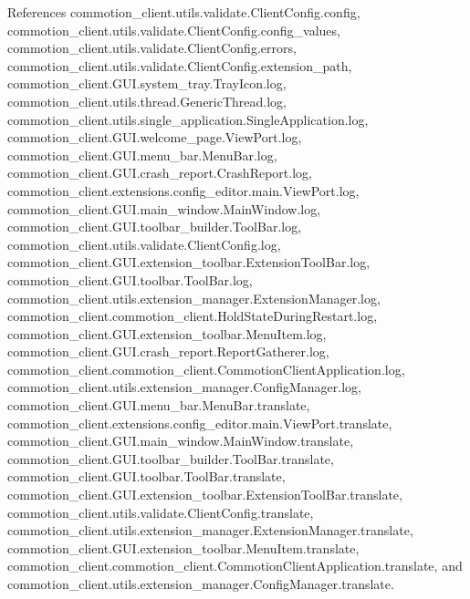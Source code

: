 References commotion\+\_\+client.\+utils.\+validate.\+Client\+Config.\+config, commotion\+\_\+client.\+utils.\+validate.\+Client\+Config.\+config\+\_\+values, commotion\+\_\+client.\+utils.\+validate.\+Client\+Config.\+errors, commotion\+\_\+client.\+utils.\+validate.\+Client\+Config.\+extension\+\_\+path, commotion\+\_\+client.\+G\+U\+I.\+system\+\_\+tray.\+Tray\+Icon.\+log, commotion\+\_\+client.\+utils.\+thread.\+Generic\+Thread.\+log, commotion\+\_\+client.\+utils.\+single\+\_\+application.\+Single\+Application.\+log, commotion\+\_\+client.\+G\+U\+I.\+welcome\+\_\+page.\+View\+Port.\+log, commotion\+\_\+client.\+G\+U\+I.\+menu\+\_\+bar.\+Menu\+Bar.\+log, commotion\+\_\+client.\+G\+U\+I.\+crash\+\_\+report.\+Crash\+Report.\+log, commotion\+\_\+client.\+extensions.\+config\+\_\+editor.\+main.\+View\+Port.\+log, commotion\+\_\+client.\+G\+U\+I.\+main\+\_\+window.\+Main\+Window.\+log, commotion\+\_\+client.\+G\+U\+I.\+toolbar\+\_\+builder.\+Tool\+Bar.\+log, commotion\+\_\+client.\+utils.\+validate.\+Client\+Config.\+log, commotion\+\_\+client.\+G\+U\+I.\+extension\+\_\+toolbar.\+Extension\+Tool\+Bar.\+log, commotion\+\_\+client.\+G\+U\+I.\+toolbar.\+Tool\+Bar.\+log, commotion\+\_\+client.\+utils.\+extension\+\_\+manager.\+Extension\+Manager.\+log, commotion\+\_\+client.\+commotion\+\_\+client.\+Hold\+State\+During\+Restart.\+log, commotion\+\_\+client.\+G\+U\+I.\+extension\+\_\+toolbar.\+Menu\+Item.\+log, commotion\+\_\+client.\+G\+U\+I.\+crash\+\_\+report.\+Report\+Gatherer.\+log, commotion\+\_\+client.\+commotion\+\_\+client.\+Commotion\+Client\+Application.\+log, commotion\+\_\+client.\+utils.\+extension\+\_\+manager.\+Config\+Manager.\+log, commotion\+\_\+client.\+G\+U\+I.\+menu\+\_\+bar.\+Menu\+Bar.\+translate, commotion\+\_\+client.\+extensions.\+config\+\_\+editor.\+main.\+View\+Port.\+translate, commotion\+\_\+client.\+G\+U\+I.\+main\+\_\+window.\+Main\+Window.\+translate, commotion\+\_\+client.\+G\+U\+I.\+toolbar\+\_\+builder.\+Tool\+Bar.\+translate, commotion\+\_\+client.\+G\+U\+I.\+toolbar.\+Tool\+Bar.\+translate, commotion\+\_\+client.\+G\+U\+I.\+extension\+\_\+toolbar.\+Extension\+Tool\+Bar.\+translate, commotion\+\_\+client.\+utils.\+validate.\+Client\+Config.\+translate, commotion\+\_\+client.\+utils.\+extension\+\_\+manager.\+Extension\+Manager.\+translate, commotion\+\_\+client.\+G\+U\+I.\+extension\+\_\+toolbar.\+Menu\+Item.\+translate, commotion\+\_\+client.\+commotion\+\_\+client.\+Commotion\+Client\+Application.\+translate, and commotion\+\_\+client.\+utils.\+extension\+\_\+manager.\+Config\+Manager.\+translate.


